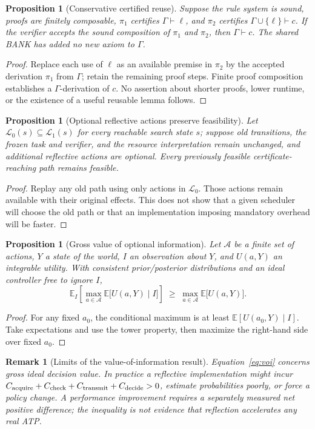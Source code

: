\documentclass[11pt,letterpaper]{article}
\newtheorem{proposition}[definition]{Proposition}
\newtheorem{remark}[definition]{Remark}
\begin{document}
\begin{proposition}[Conservative certified reuse]\label{prop:reuse}
Suppose the rule system is sound, proofs are finitely composable, $\pi_1$ certifies $\Gamma\vdash\ell$, and $\pi_2$ certifies $\Gamma\cup\{\ell\}\vdash c$. If the verifier accepts the sound composition of $\pi_1$ and $\pi_2$, then $\Gamma\vdash c$. The shared BANK has added no new axiom to $\Gamma$.
\end{proposition}
\begin{proof}
Replace each use of $\ell$ as an available premise in $\pi_2$ by the accepted derivation $\pi_1$ from $\Gamma$; retain the remaining proof steps. Finite proof composition establishes a $\Gamma$-derivation of $c$. No assertion about shorter proofs, lower runtime, or the existence of a useful reusable lemma follows.
\end{proof}

\begin{proposition}[Optional reflective actions preserve feasibility]\label{prop:optional}
Let $\mathcal L_0(s)\subseteq\mathcal L_1(s)$ for every reachable search state $s$; suppose old transitions, the frozen task and verifier, and the resource interpretation remain unchanged, and additional reflective actions are \emph{optional}. Every previously feasible certificate-reaching path remains feasible.
\end{proposition}
\begin{proof}
Replay any old path using only actions in $\mathcal L_0$. Those actions remain available with their original effects. This does not show that a given scheduler will choose the old path or that an implementation imposing mandatory overhead will be faster.
\end{proof}

\begin{proposition}[Gross value of optional information]\label{prop:voi}
Let $\mathcal A$ be a finite set of actions, $Y$ a state of the world, $I$ an observation about $Y$, and $U(a,Y)$ an integrable utility. With consistent prior/posterior distributions and an ideal controller free to ignore $I$,
\begin{equation}\label{eq:voi}
\mathbb E_I\!\left[\max_{a\in\mathcal A}\mathbb E\bigl[U(a,Y)\mid I\bigr]\right]
\;\ge\;\max_{a\in\mathcal A}\mathbb E\bigl[U(a,Y)\bigr].
\end{equation}
\end{proposition}
\begin{proof}
For any fixed $a_0$, the conditional maximum is at least $\mathbb E[U(a_0,Y)\mid I]$. Take expectations and use the tower property, then maximize the right-hand side over fixed $a_0$.
\end{proof}
\begin{remark}[Limits of the value-of-information result]
Equation~\eqref{eq:voi} concerns \emph{gross} ideal decision value. In practice a reflective implementation might incur $C_{\rm acquire}+C_{\rm check}+C_{\rm transmit}+C_{\rm decide}>0$, estimate probabilities poorly, or force a policy change. A performance improvement requires a separately measured \emph{net} positive difference; the inequality is not evidence that reflection accelerates any real ATP.
\end{remark}
\end{document}
